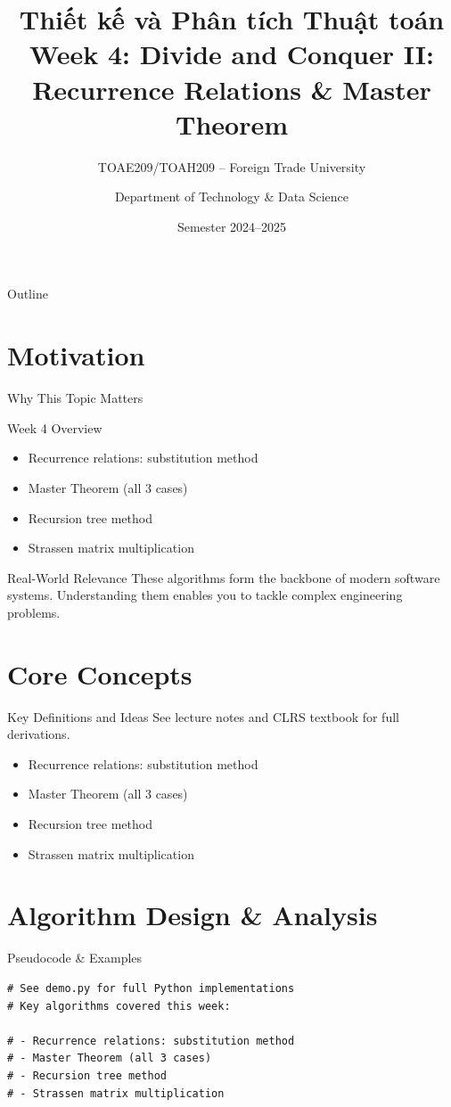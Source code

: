 \documentclass[aspectratio=169,xcolor=dvipsnames]{beamer}
\title[Algorithms -- Week 4]{\textbf{Thiết kế và Phân tích Thuật toán}\\
  \large Week 4: Divide and Conquer II: Recurrence Relations & Master Theorem}
\subtitle{TOAE209/TOAH209 -- Foreign Trade University}
\author{Department of Technology \& Data Science}
\date{Semester 2024--2025}
\begin{document}
\begin{frame}\titlepage\end{frame}
\begin{frame}{Outline}\tableofcontents\end{frame}

\section{Motivation}
\begin{frame}{Why This Topic Matters}
  \begin{block}{Week 4 Overview}
    \begin{itemize}
    \item Recurrence relations: substitution method
    \item Master Theorem (all 3 cases)
    \item Recursion tree method
    \item Strassen matrix multiplication
    \end{itemize}
  \end{block}
  \begin{exampleblock}{Real-World Relevance}
    These algorithms form the backbone of modern software systems.
    Understanding them enables you to tackle complex engineering problems.
  \end{exampleblock}
\end{frame}

\section{Core Concepts}
\begin{frame}{Key Definitions and Ideas}
  See lecture notes and CLRS textbook for full derivations.
  \begin{itemize}
    \item Recurrence relations: substitution method
    \item Master Theorem (all 3 cases)
    \item Recursion tree method
    \item Strassen matrix multiplication
  \end{itemize}
\end{frame}

\section{Algorithm Design \& Analysis}
\begin{frame}[fragile]{Pseudocode \& Examples}
  \begin{lstlisting}
# See demo.py for full Python implementations
# Key algorithms covered this week:

# - Recurrence relations: substitution method
# - Master Theorem (all 3 cases)
# - Recursion tree method
# - Strassen matrix multiplication
  \end{lstlisting}
\end{frame}
\end{document}
